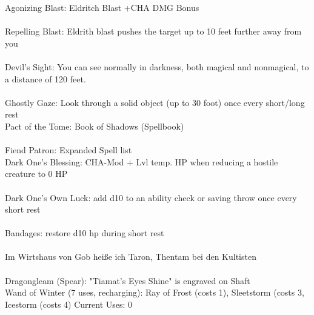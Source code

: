 \documentclass[10pt,a4paper]{scrbook}
\begin{document}
{{\begin{itemize}
			\end{itemize}
			Agonizing Blast: Eldritch Blast +CHA DMG Bonus \\%
			\\%
			Repelling Blast: Eldrith blast pushes the target up to 10 feet further away from you \\
			\\
			Devil’s Sight: You can see normally in darkness, both magical and nonmagical, to a distance of 120 feet. \\
			\\
			Ghostly Gaze: Look through a solid object (up to 30 foot) once every short/long rest
			\\
			Pact of the Tome: Book of Shadows (Spellbook) \\
			\\
			Fiend Patron: Expanded Spell list \\
			Dark One's Blessing: CHA-Mod + Lvl temp. HP when reducing a hostile creature to 0 HP \\
			\\
			Dark One's Own Luck: add d10 to an ability check or saving throw once every short rest \\
			\\
			Bandages: restore d10 hp during short rest \\
			\\
			Im Wirtshaus von Gob heiße ich Taron, Thentam bei den Kultisten \\
			\\
			Dragongleam (Spear): "Tiamat’s Eyes Shine" is engraved on Shaft \\
			Wand of Winter (7 uses, recharging): Ray of Frost (costs 1), Sleetstorm (costs 3, Icestorm (costs 4) Current Uses: 0
		}
	}

	\pagebreak
	
\end{document}
